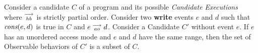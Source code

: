 

\begin{theorem}
    Consider a candidate $C$ of a program and its possible \textit{Candidate Executions} where $\stackrel{\longrightarrow}{_\textit{hb}}$ is strictly partial order. Consider two \textbf{write} events $e$ and $d$ such that $\textit{cons}(e,d)$ is true in $C$ and  $e\stackrel{\longrightarrow}{_{ao}}d$. Consider a Candidate $C'$ without event $e$.  If $e$ has an unordered access mode and $e$ and $d$ have the same range, then the set of Observable behaviors of $C'$ is a subset of $C$.  
\end{theorem}